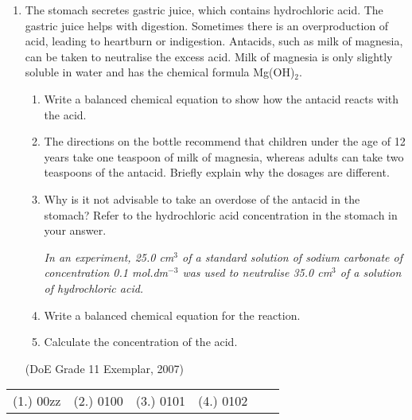 \begin{eocexercises}{}
\begin{enumerate}
\item{
The stomach secretes gastric juice, which contains hydrochloric acid. The gastric juice helps with digestion. Sometimes there is an overproduction of acid, leading to heartburn or indigestion. Antacids, such as milk of magnesia, can be taken to neutralise the excess acid. Milk of magnesia is only slightly soluble in water and has the chemical formula Mg(OH)$_{2}$.
\begin{enumerate}
\item{Write a balanced chemical equation to show how the antacid reacts with the acid.}
\item{The directions on the bottle recommend that children under the age of 12 years take one teaspoon of milk of magnesia, whereas adults can take two teaspoons of the antacid. Briefly explain why the dosages are different.}
\item{Why is it not advisable to take an overdose of the antacid in the stomach? Refer to the hydrochloric acid concentration in the stomach in your answer.}

\textit{In an experiment, 25.0 cm$^{3}$ of a standard solution of sodium carbonate of concentration 0.1 mol.dm$^{-3}$ was used to neutralise 35.0 cm$^{3}$ of a solution of hydrochloric acid.}

\item{Write a balanced chemical equation for the reaction.}
\item{Calculate the concentration of the acid.}
\end{enumerate}
}
(DoE Grade 11 Exemplar, 2007)
\end{enumerate}

\practiceinfo

\begin{tabular}[h]{cccccc}
(1.) 00zz & (2.) 0100 & (3.) 0101 & (4.) 0102 & 
 \end{tabular}
\end{eocexercises}









